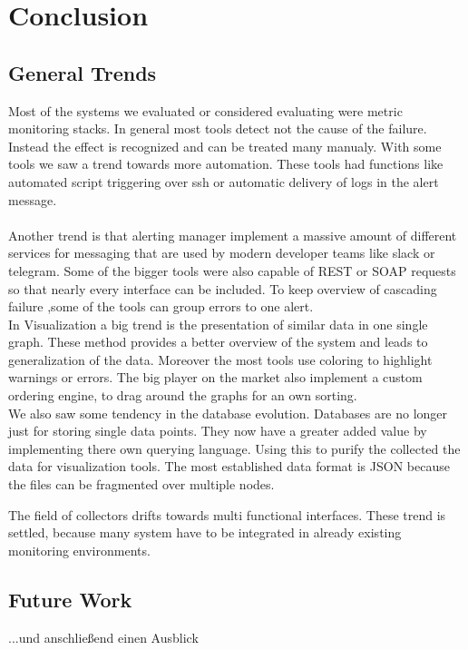 
\chapter{Conclusion}\label{chap:conclusion}
\section{General Trends}
Most of the systems we evaluated or considered evaluating were metric monitoring stacks. In general most tools detect not the cause of the failure. Instead the effect is recognized and can be treated many manualy. With some tools we saw a trend towards more automation. These tools had functions like automated script triggering over ssh or automatic delivery of logs in the alert message. \\
\\
Another trend is that alerting manager implement a massive amount of different services for messaging that are used by modern developer teams like slack or telegram. Some of the bigger tools were also capable of REST or SOAP requests so that nearly every interface can be included. To keep overview of cascading failure ,some of the tools can group errors to one alert.
\\
In Visualization a big trend is the presentation of similar data in one single graph. These method provides a better overview of the system and leads to generalization of the data. Moreover the most tools use coloring to highlight warnings or errors. The big player on the market also implement a custom ordering engine, to drag around the graphs for an own sorting.
\\
We also saw some tendency in the database evolution. Databases are no longer just for storing single data points. They now have a greater added value by implementing there own querying language. Using this to purify the collected the data for visualization tools. The most established data format is JSON because the files can be fragmented over multiple nodes.

The field of collectors drifts towards multi functional interfaces. These trend is settled, because many system have to be integrated in already existing monitoring environments. 
\section*{Future Work}
...und anschließend einen Ausblick

